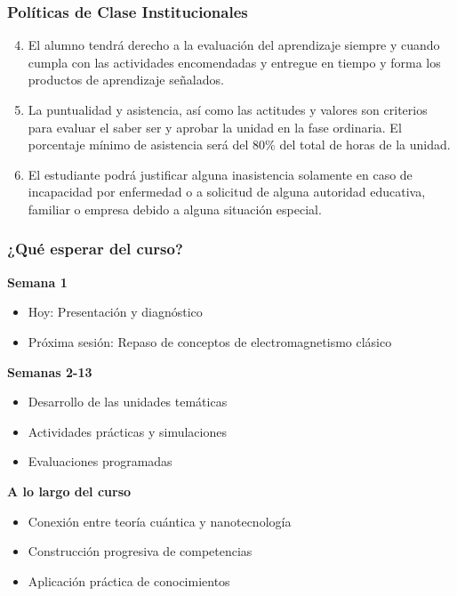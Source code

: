 \documentclass{beamer}
\begin{document}
\begin{frame}
    \frametitle{Políticas de Clase Institucionales}
    \begin{enumerate}\setcounter{enumi}{3}
        \item El alumno tendrá derecho a la evaluación del aprendizaje siempre y cuando cumpla con las actividades encomendadas y entregue en tiempo y forma los productos de aprendizaje señalados.
        
        \item La puntualidad y asistencia, así como las actitudes y valores son criterios para evaluar el saber ser y aprobar la unidad en la fase ordinaria. El porcentaje mínimo de asistencia será del 80\% del total de horas de la unidad.
        
        \item El estudiante podrá justificar alguna inasistencia solamente en caso de incapacidad por enfermedad o a solicitud de alguna autoridad educativa, familiar o empresa debido a alguna situación especial.
    \end{enumerate}
\end{frame}

\begin{frame}
    \frametitle{¿Qué esperar del curso?}
    
    \textbf{Semana 1}
    \begin{itemize}
        \item Hoy: Presentación y diagnóstico
        \item Próxima sesión: Repaso de conceptos de electromagnetismo clásico
    \end{itemize}
    \vspace{0.2cm}
    
    \textbf{Semanas 2-13}
    \begin{itemize}
        \item Desarrollo de las unidades temáticas
        \item Actividades prácticas y simulaciones
        \item Evaluaciones programadas
    \end{itemize}
    \vspace{0.2cm}
    
    \textbf{A lo largo del curso}
    \begin{itemize}
        \item Conexión entre teoría cuántica y nanotecnología
        \item Construcción progresiva de competencias
        \item Aplicación práctica de conocimientos
    \end{itemize}
\end{frame}
\end{document}
